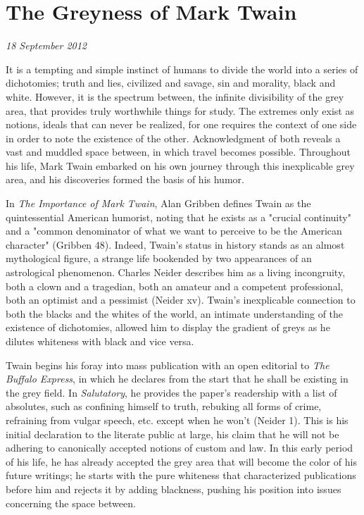 \section{The Greyness of Mark Twain}

\textit{18 September 2012}

It is a tempting and simple instinct of humans to divide the world into a series
of dichotomies; truth and lies, civilized and savage, sin and morality, black
and white. However, it is the spectrum between, the infinite divisibility of the
grey area, that provides truly worthwhile things for study. The extremes only
exist as notions, ideals that can never be realized, for one requires the
context of one side in order to note the existence of the other. Acknowledgment
of both reveals a vast and muddled space between, in which travel becomes
possible. Throughout his life, Mark Twain embarked on his own journey through
this inexplicable grey area, and his discoveries formed the basis of his humor.

In \textit{The Importance of Mark Twain}, Alan Gribben defines Twain as the
quintessential American humorist, noting that he exists as a "crucial
continuity" and a "common denominator of what we want to perceive to be the
American character" (Gribben 48). Indeed, Twain's status in history stands as an
almost mythological figure, a strange life bookended by two appearances of an
astrological phenomenon. Charles Neider describes him as a living incongruity,
both a clown and a tragedian, both an amateur and a competent professional, both
an optimist and a pessimist (Neider xv). Twain's inexplicable connection to both
the blacks and the whites of the world, an intimate understanding of the
existence of dichotomies, allowed him to display the gradient of greys as he
dilutes whiteness with black and vice versa.

Twain begins his foray into mass publication with an open editorial to
\textit{The Buffalo Express}, in which he declares from the start that he shall
be existing in the grey field. In \textit{Salutatory}, he provides the paper's
readership with a list of absolutes, such as confining himself to truth,
rebuking all forms of crime, refraining from vulgar speech, etc. except when he
won't (Neider 1). This is his initial declaration to the literate public at
large, his claim that he will not be adhering to canonically accepted notions of
custom and  law. In this early period of his life, he has already accepted the
grey area that will become the color of his future writings; he starts with the
pure whiteness that characterized publications before him and rejects it by
adding blackness, pushing his position into issues concerning the space between.

